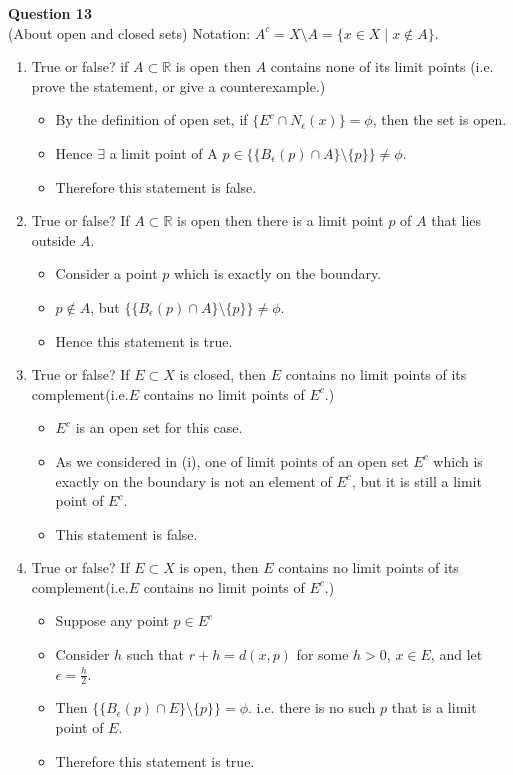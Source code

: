 \documentclass[12pt]{article}
\begin{document}
\newpage
\vspace{1.5\baselineskip}
\textbf{Question 13}\\
(About open and closed sets) Notation: $A^c = X\setminus A = \{x\in X\;|\; x\notin A \}$.
\begin{enumerate}[label=(\roman*)]
    \item True or false? if $A \subset \mathbb{R}$ is open then $A$ contains none of its limit points (i.e. prove the statement, or give a counterexample.)
        \begin{itemize}
            \item By the definition of open set, if $\{E^c \cap N_\epsilon(x)\} = \phi$, then the set is open.
            \item Hence $\exists$ a limit point of A $p \in\{\{B_\epsilon(p) \cap A\}\setminus\{p\}\} \neq \phi$.
            \item Therefore this statement is false.
        \end{itemize}
    
    \item True or false? If $A \subset \mathbb{R}$ is open then there is a limit point $p$ of $A$ that lies outside $A$.
        \begin{itemize}
            \item Consider a point $p$ which is exactly on the boundary.
            \item $p \notin A$, but $\{\{B_\epsilon(p) \cap A\}\setminus\{p\}\} \neq \phi$.
            \item Hence this statement is true.
        \end{itemize}
    
    \item True or false? If $E\subset X$ is closed, then $E$ contains no limit points of its complement(i.e.$E$ contains no limit points of $E^c$.)
        \begin{itemize}
            \item $E^c$ is an open set for this case.
            \item As we considered in (i), one of limit points of an open set $E^c$ which is exactly on the boundary is not an element of $E^c$, but it is still a limit point of $E^c$.
            \item This statement is false.
        \end{itemize}
    
    \item True or false? If $E\subset X$ is open, then $E$ contains no limit points of its complement(i.e.$E$ contains no limit points of $E^c$.)
        \begin{itemize}
             \item Suppose any point $p \in E^c$
             \item Consider $h$ such that $r+h = d(x,p)$ for some $h>0$, $x\in E$, and let $\epsilon = \frac{h}{2}$.
             \item Then $\{\{B_\epsilon(p) \cap E\}\setminus\{p\}\} = \phi$. i.e. there is no such $p$ that is a limit point of $E$.
             \item Therefore this statement is true.
        \end{itemize}
\end{enumerate}
\end{document}
